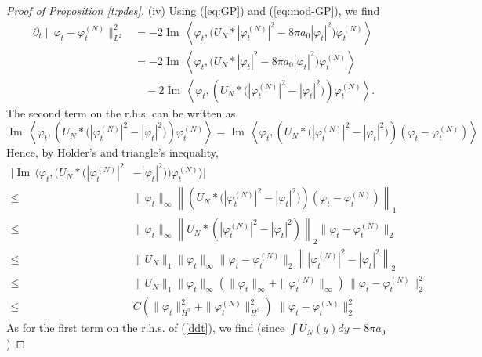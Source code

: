 \documentclass[11pt,a4paper,DIV11]{scrartcl}	%
\renewcommand{\Im}{\operatorname{Im}\,} 	%
\begin{document}
\begin{proof}[Proof of Proposition \ref{t:pdes}]
(iv) Using (\ref{eq:GP}) and (\ref{eq:mod-GP}), we find
\begin{equation}\label{ddt}
    \begin{aligned}
      \partial_t \| \varphi_t - \varphi_t^{(N)} \|_{L^2}^2 & = -2 \Im \left\langle
      \varphi_t, \big(U_N * |\varphi_t^{(N)}|^2 - 8 \pi a_0 |\varphi_t|^2\big)
      \varphi_t^{(N)} \right\rangle \\
      & = - 2 \Im \left\langle \varphi_t, \big(U_N * |\varphi_t|^2 - 8 \pi a_0
      |\varphi_t|^2\big) \varphi_t^{(N)} \right\rangle \\
      & \quad - 2 \Im \left\langle \varphi_t, \left( U_N * \big(|\varphi_t^{(N)}|^2 -
      |\varphi_t|^2\big) \right) \varphi_t^{(N)} \right\rangle.
    \end{aligned}
  \end{equation}
The second term on the r.h.s. can be written as
\[  \Im \left\langle \varphi_t, \left( U_N * \big(|\varphi_t^{(N)}|^2 -
      |\varphi_t|^2\big) \right) \varphi_t^{(N)} \right\rangle = \Im \left\langle \varphi_t, \left( U_N * \big(|\varphi_t^{(N)}|^2 -  |\varphi_t|^2\big) \right) (\varphi_t - \varphi_t^{(N)}) \right\rangle \]
 Hence, by H\"older's and triangle's inequality, 
\begin{equation}\label{ddt-2} \begin{split} 
\Big|  \Im \Big\langle \varphi_t, \Big( U_N * \big(|\varphi_t^{(N)}|^2 &-
      |\varphi_t|^2\big) \Big) \varphi_t^{(N)} \Big\rangle \Big| \\ \leq \; & \| \varphi_t \|_\infty \left\| \left( U_N * \big(|\varphi_t^{(N)}|^2 -  |\varphi_t|^2\big) \right) (\varphi_t - \varphi_t^{(N)}) \right\|_1 \\ \leq \; & 
  \| \varphi_t \|_\infty  \left\| U_N * (|\varphi_t^{(N)}|^2 - |\varphi_t|^2 )\right\|_2 \| \varphi_t - \varphi_t^{(N)} \|_2 \\ \leq \; & \| U_N \|_1 \| \varphi_t \|_\infty \| \varphi_t - \varphi_t^{(N)} \|_2  \left\| |\varphi_t^{(N)}|^2 - |\varphi_t|^2 \right\|_2 \\ \leq \; &  \| U_N \|_1 \| \varphi_t \|_\infty \left( \| \varphi_t \|_\infty + \| \varphi_t^{(N)} \|_\infty \right) \,  \| \varphi_t - \varphi_t^{(N)} \|^2_2 \\ \leq \; & C  \left( \| \varphi_t \|^2_{H^2} + \| \varphi_t^{(N)}  \|^2_{H^2}  \right) \, \,  \| \varphi_t - \varphi_t^{(N)} \|^2_2
\end{split} \end{equation}
As for the first term on the r.h.s. of (\ref{ddt}), we find (since $\int U_N (y) dy = 8 \pi a_0$) 

\end{proof}
\end{document}
